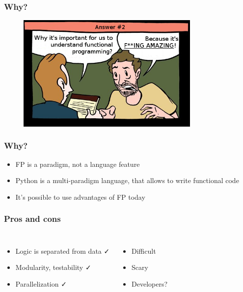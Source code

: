 \documentclass[18pt, compress]{beamer}
\def\check{\textcolor{check}{\FA \faCheck}}
\def\fail{\textcolor{fail}{\FA \faRemove}}
\begin{document}
\begin{frame}
    \frametitle{Why?}
    \vspace{-25pt}
    \begin{figure}
        \includegraphics[width=0.8\textwidth,center]{second_option.png}
    \end{figure}
\end{frame}

\begin{frame}[fragile]
    \frametitle{Why?}
    \begin{itemize}[label={\MVRightarrow}]
        \item FP is a paradigm, not a language feature
        \item Python is a multi-paradigm language, that allows to write functional code
        \item It's possible to use advantages of FP today
    \end{itemize}
\end{frame}

\fontsize{15pt}{16}\selectfont
\begin{frame}
    \frametitle{Pros and cons}
    \vspace{-20pt}
    \begin{columns}[T,onlytextwidth]
    \begin{itemize}[label={\MVRightarrow}, leftmargin=-0.05cm]
            \item <+->Logic is separated from data  \check
            \item <+->Modularity, testability \check
            \item <+->Parallelization \check
        \end{itemize}

        \begin{itemize}[label={\MVRightarrow}]
            \item <+->Difficult \fail
            \item <+->Scary \fail
            \item <+->Developers? \fail
        \end{itemize}
    \end{columns}
\end{frame}
\fontsize{17pt}{18}\selectfont
\end{document}
